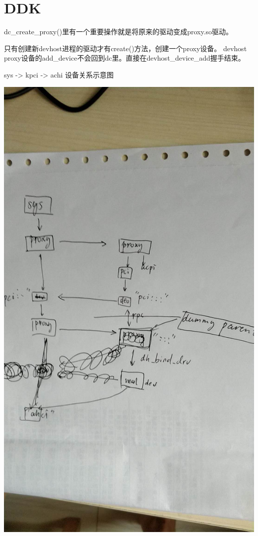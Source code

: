 \section{DDK}

dc_create_proxy()里有一个重要操作就是将原来的驱动变成proxy.so驱动。

只有创建新devhost进程的驱动才有create()方法，创建一个proxy设备。
devhost proxy设备的add_device不会回到dc里。直接在devhost_device_add握手结束。


sys -> kpci -> achi 设备关系示意图

\includegraphics[scale=0.3]{devdrv.jpeg}

